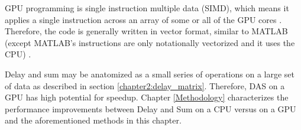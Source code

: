     GPU programming is single instruction multiple data (SIMD), which means it applies a single instruction across an array of some or all of the GPU cores \cite{cardosoChapterHighperformanceEmbedded2017}. Therefore, the code is generally written in vector format, similar to MATLAB (except MATLAB's instructions are only notationally vectorized and it uses the CPU) \cite{VectorizationMATLABSimulink}.

    Delay and sum may be anatomized as a small series of operations on a large set of data as described in section \ref{chapter2:delay_matrix}. Therefore, DAS on a GPU has high potential for speedup. Chapter \ref{Methodology} characterizes the performance improvements between Delay and Sum on a CPU versus on a GPU and the aforementioned methods in this chapter.